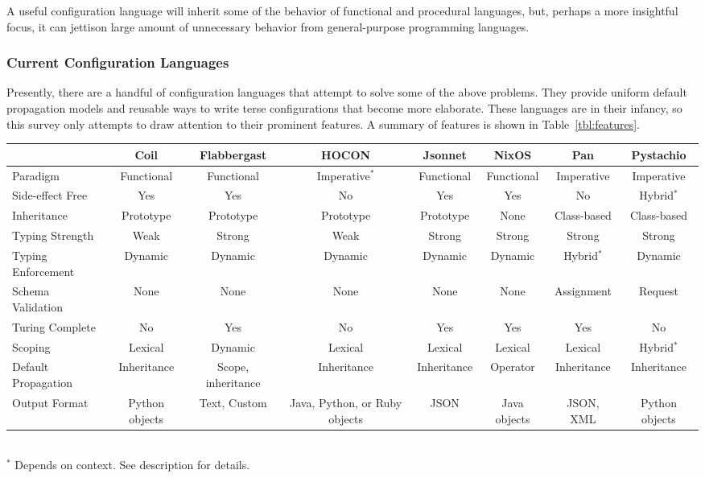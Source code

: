 \documentclass[letterpaper,twocolumn,10pt]{article}
\begin{document}
A useful configuration language will inherit some of the behavior of functional and procedural languages, but, perhaps a more insightful focus, it can jettison large amount of unnecessary behavior from general-purpose programming languages.

\subsubsection{Current Configuration Languages}
Presently, there are a handful of configuration languages that attempt to solve some of the above problems. They provide uniform default propagation models and reusable ways to write terse configurations that become more elaborate. These languages are in their infancy, so this survey only attempts to draw attention to their prominent features. A summary of features is shown in Table~\ref{tbl:features}.

\begin{table*}
\caption{\label{tbl:features}Comparison of configuration languages}
\scriptsize
\begin{tabular}{lccccccc}
\hline
										& Coil						& Flabbergast					& HOCON					& Jsonnet			& NixOS				& Pan & Pystachio \\\hline
Paradigm						& Functional			& Functional					& Imperative$^*$&	Functional	& Functional	& Imperative			& Imperative \\
Side-effect Free		& Yes							& Yes									& No						&	Yes					& Yes					& No							& Hybrid$^*$ \\
Inheritance					& Prototype				& Prototype						& Prototype			&	Prototype		& None				& Class-based			& Class-based \\
Typing Strength			& Weak						& Strong							& Weak					&	Strong			& Strong			& Strong					& Strong \\
Typing Enforcement	& Dynamic					& Dynamic							&	Dynamic				&	Dynamic			& Dynamic			& Hybrid$^*$			& Dynamic \\
Schema Validation		& None						& None								& None					& None				& None				& Assignment			& Request \\
Turing Complete			& No							& Yes									& No						& Yes					& Yes					& Yes							& No \\
Scoping							& Lexical					& Dynamic							& Lexical				& Lexical			& Lexical			& Lexical					& Hybrid$^*$ \\
Default Propagation	& Inheritance			&	Scope, inheritance	& Inheritance		& Inheritance	& Operator		& Inheritance			& Inheritance \\
Output Format				& Python objects	&	Text, Custom				& Java, Python, or Ruby objects		& JSON				& Java objects			& JSON, XML				& Python objects \\
\hline
\end{tabular}\\
$^*$ Depends on context. See description for details.
\end{table*}
\end{document}
